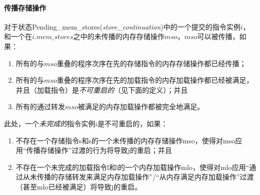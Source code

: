 \paragraph{传播存储操作}\label{omm:prop_store}
对于状态{\sc Pending\_mem\_stores}({\it store\_continuation})中的一个提交的指令实例$i$，和一个在$i.\textit{mem\_stores}$之中的未传播的内存存储操作$mso$，$mso$可以被传播，如果：
\begin{enumerate}
\item 所有的与$mso$重叠的程序次序在先的存储指令的内存存储操作都已经传播；  %
\item 所有的与$mso$重叠的程序次序在先的加载指令的内存加载操作都已经被满足，并且（加载指令）是{\em 不可重启的}（见下面的定义）；并且  %
\item 所有的通过转发$mso$被满足的内存加载操作都被完全地满足。  %
\end{enumerate}
此处，一个{\em 未完成的}指令实例$i$是不可重启的，如果：
\begin{enumerate}
\item 不存在一个存储指令s和s的一个未传播的内存存储操作mso，使得对mso应用“传播存储操作”过渡的行为将导致j的重启；并且 %
\item 不存在一个未完成的加载指令l和l的一个内存加载操作mlo，使得对mlo应用“通过从未传播的存储转发来满足内存加载操作”/“从内存满足内存加载操作”过渡（甚至mlo已经被满足）将导致j的重启。  %
\end{enumerate}
